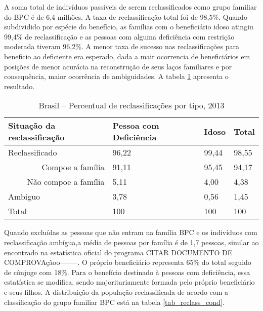 \documentclass[
	12pt,				%
	openright,			%
	twoside,			%
	a4paper,			%
	english,			%
	french,				%
	spanish,			%
	brazil				%
	]{abntex2}
\begin{document}
A soma total de indivíduos passiveis de serem reclassificados como grupo familiar do BPC é de 6,4 milhões. A taxa de reclassificação total foi de 98,5\%. Quando subdividido por espécie do benefício, as famílias com o beneficiário idoso atingiu 99,4\% de reclassificação e as pessoas com alguma deficiência com restrição moderada tiveram 96,2\%. A menor taxa de sucesso nas reclassificações para beneficio ao deficiente era esperado, dada a mair ocorrencia de beneficiários em posições de menor acurácia na reconstrução de seus laços familiares e por consequência, maior ocorrência de ambiguidades. A tabela \ref*{tab_per_reclas} apresenta o resultado. 

\begin{table}[h]
	\footnotesize
	\centering
	\caption{Brasil -- Percentual de reclassificações por tipo, 2013}
	\label{tab_per_reclas}
	\begin{tabular}{@{}p{4.5cm}p{4cm}p{3cm}p{3cm}@{}}
		\toprule
		\textbf{Situação da reclassificação}     & \textbf{Pessoa com Deficiência} & \textbf{Idoso} & \textbf{Total} \\ \midrule
		Reclassificado                           & 96,22                  & 99,44 & 98,55 \\                 
		\multicolumn{1}{r}{Compoe a família}     & 91,11                  & 95,45 & 94,17 \\               
		\multicolumn{1}{r}{Não compoe a família} & 5,11                   & 4,00  & 4,38  \\               
		Ambíguo                                  & 3,78                   & 0,56  & 1,45  \\ \midrule
		Total                                    & 100                    & 100   & 100   \\ \bottomrule
	\end{tabular}
\end{table}

Quando excluídas as pessoas que não entram na família BPC e os indivíduos com reclassificação ambígua,a média de pessoas por família é de 1,7 pessoas, similar ao encontrado na estatística oficial do programa CITAR DOCUMENTO DE COMPROVAçãoo--------. O próprio beneficiário representa 65\% do total seguido de cônjuge com 18\%. Para o benefício destinado à pessoas com deficiência, essa estatística se modifica, sendo majoritariamente formada pelo próprio beneficiário e seus filhos. A distribuição da população reclassificada de acordo com a classificação do grupo familiar BPC está na tabela \ref*{tab_reclass_cond}.
\end{document}
